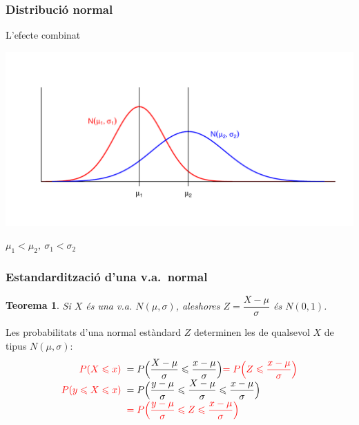 \documentclass[12pt,t]{beamer}\usepackage[]{graphicx}\usepackage[]{color}
\newcommand{\red}[1]{\textcolor{red}{#1}}
\renewcommand{\leq}{\leqslant}
\theoremstyle{plain}
\newtheorem{teorema}{Teorema}
\theoremstyle{definition}
\begin{document}
\begin{frame}
\frametitle{Distribució normal}

L'efecte combinat
\begin{center}
\includegraphics[width=\linewidth]{musigma}

$\mu_1<\mu_2,\ \sigma_1<\sigma_2$
\end{center}
\end{frame}




\begin{frame}
\frametitle{Estandardització d'una v.a.\ normal}

\begin{teorema}
Si $X$ és una v.a. $N(\mu,\sigma)$, aleshores
$Z=\dfrac{X-\mu}{\sigma}$
és $N(0,1)$.
\end{teorema}

Les probabilitats d'una normal estàndard $Z$ determinen les de qualsevol $X$ de tipus $N(\mu,\sigma)$:
$$
\begin{array}{rl}
\red{P(X\leq x)} & \displaystyle \hspace*{-1ex} =P\Big(\frac{X-\mu}{\sigma}\leq \frac{x-\mu}{\sigma}\Big)\red{=P\Big(Z\leq \frac{x-\mu}{\sigma}\Big)}\\[1ex]
\red{P(y\leq X\leq x)} & \displaystyle \hspace*{-1ex} =P\Big( \frac{y-\mu}{\sigma}\leq \frac{X-\mu}{\sigma}\leq \frac{x-\mu}{\sigma}\Big)\\[1ex] & \displaystyle \hspace*{-1ex} \red{=P\Big(\frac{y-\mu}{\sigma}\leq Z\leq \frac{x-\mu}{\sigma}\Big)}
\end{array}
$$
\end{frame}
\end{document}
